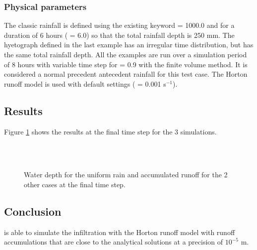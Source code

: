 \subsubsection{Physical parameters}

The classic rainfall is defined using the existing keyword
 = 1000.0 and for a duration of 6 hours
( = 6.0) so that the total
rainfall depth is 250 mm. The hyetograph defined in the last example has an
irregular time distribution, but has the same total rainfall depth.
All the examples are run over a simulation period of 8 hours with variable time
step for  = 0.9 with the finite volume method.
It is considered a normal precedent antecedent rainfall for this test case.
The Horton runoff model is used with default settings
( = 0.001 s$^{-1}$).

\subsection{Results}

Figure \ref{pluiehorton:fig:res} shows the results at the final time step for
the 3 simulations.

\begin{figure}[!htbp]
 \centering
 \\
 \\
 \caption{Water depth for the uniform rain and accumulated runoff for the 2 other cases at the final time step.}
 \label{pluiehorton:fig:res}
\end{figure}

\subsection{Conclusion}
 is able to simulate the infiltration with the Horton runoff model
with runoff accumulations that are close to the analytical solutions at a precision of $10^{-5}$ m.
